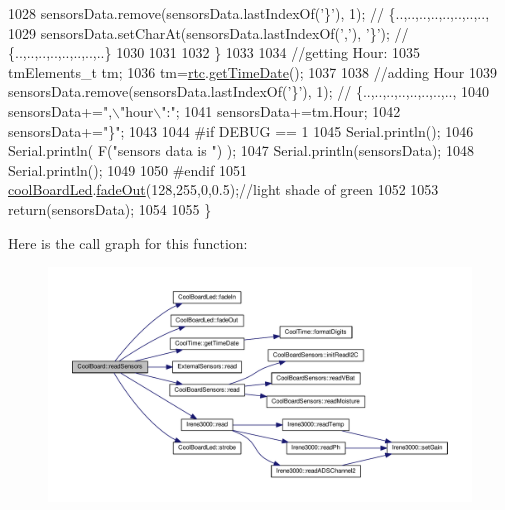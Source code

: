 \begin{DoxyCode}
1028         sensorsData.remove(sensorsData.lastIndexOf(\textcolor{charliteral}{'\}'}), 1); \textcolor{comment}{// \{..,..,..,..,..,..,..,..,}
1029         sensorsData.setCharAt(sensorsData.lastIndexOf(\textcolor{charliteral}{','}), \textcolor{charliteral}{'\}'}); \textcolor{comment}{// \{..,..,..,..,..,..,..,..\}      }
1030         
1031         
1032     \}
1033 
1034     \textcolor{comment}{//getting Hour:}
1035     tmElements\_t tm;
1036     tm=\hyperlink{classCoolBoard_a50d2a6716879d64a85f3c6b44ad63275}{rtc}.\hyperlink{classCoolTime_a7a7501c5ca77dd1248bea704c44f986c}{getTimeDate}();
1037     
1038     \textcolor{comment}{//adding Hour}
1039     sensorsData.remove(sensorsData.lastIndexOf(\textcolor{charliteral}{'\}'}), 1); \textcolor{comment}{// \{..,..,..,..,..,..,..,..,   }
1040     sensorsData+=\textcolor{stringliteral}{",\(\backslash\)"hour\(\backslash\)":"};  
1041     sensorsData+=tm.Hour;
1042     sensorsData+=\textcolor{stringliteral}{"\}"};
1043     
1044 \textcolor{preprocessor}{#if DEBUG == 1}
1045     Serial.println();
1046     Serial.println( F(\textcolor{stringliteral}{"sensors data is "}) );
1047     Serial.println(sensorsData);
1048     Serial.println();
1049 
1050 \textcolor{preprocessor}{#endif}
1051     \hyperlink{classCoolBoard_a1b1d3c684a5baa56b08486e192fd8e97}{coolBoardLed}.\hyperlink{classCoolBoardLed_a93d545679237e8cc858324367149775c}{fadeOut}(128,255,0,0.5);\textcolor{comment}{//light shade of green}
1052 
1053     \textcolor{keywordflow}{return}(sensorsData);
1054 
1055 \}
\end{DoxyCode}
Here is the call graph for this function\+:
\nopagebreak
\begin{figure}[H]
\begin{center}
\leavevmode
\includegraphics[width=350pt]{classCoolBoard_ad03abdce2e65f520bbf2cff0f2d083cf_cgraph}
\end{center}
\end{figure}
